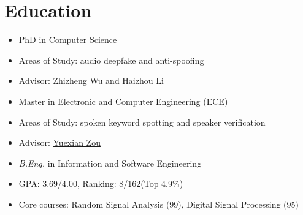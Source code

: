 \documentclass{resume}
\begin{document}



\section{Education}
\begin{itemize}
    \item PhD in Computer Science
    \item Areas of Study: audio deepfake and anti-spoofing
    \item Advisor: \href{https://sds.cuhk.edu.cn/teacher/641}{Zhizheng Wu} and \href{https://sds.cuhk.edu.cn/teacher/498}{Haizhou Li}
\end{itemize}


\begin{itemize}
    \item Master in Electronic and Computer Engineering (ECE)
    \item Areas of Study: spoken keyword spotting and speaker verification
    \item Advisor: \href{https://web.pkusz.edu.cn/adsp/}{Yuexian Zou}
\end{itemize}

\begin{itemize}
    \item \textit{B.Eng.} in Information and Software Engineering
    \item GPA: 3.69/4.00, Ranking: 8/162(Top 4.9\%)
    \item Core courses: Random Signal Analysis (99), Digital Signal Processing (95)
\end{itemize}
\end{document}
